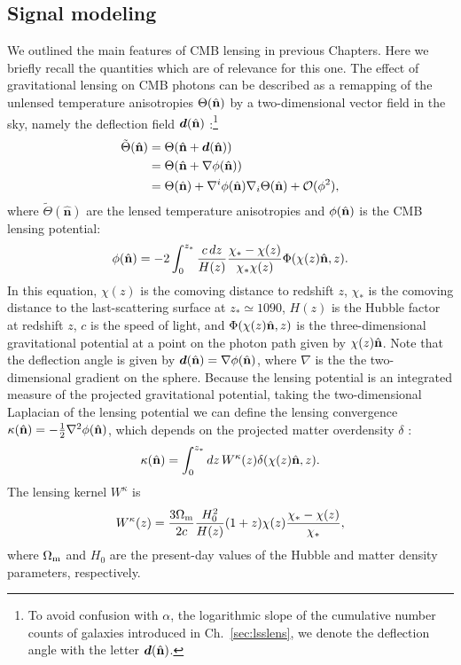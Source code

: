 \subsection{Signal modeling}
We outlined the main features of \gls{CMB} lensing in previous Chapters. Here we briefly recall the quantities which are of relevance for this one.
The effect of gravitational lensing on \gls{CMB} photons can be described as a remapping of the unlensed temperature anisotropies $\Theta(\nver)$ by a two-dimensional vector field in the sky, namely the deflection field $\bm{d}(\nver)$ \citep{Lewis2006}:\footnote{To avoid confusion with $\alpha$, the logarithmic slope of the cumulative number counts of galaxies introduced in Ch.~\eqref{sec:lsslens}, we denote the deflection angle with the letter $\bm{d}(\nver)$.}
\begin{equation}
\begin{split}
\tilde{\Theta}(\hat{\mathbf{n}}) &= \Theta(\nver + \bm{d}(\nver)) \\
&= \Theta(\nver + \nabla\phi(\nver)) \\
&= \Theta(\nver) + \nabla^i \phi(\nver) \nabla_i \Theta(\nver) + \mathcal{O}(\phi^2),
\end{split}
\end{equation}
where $\tilde{\Theta}(\hat{\mathbf{n}})$ are the lensed temperature anisotropies and $\phi(\nver)$ is the \gls{CMB} lensing potential:
\begin{equation}
\phi(\nver) = -2 \int_0^{z_*} \frac{c\,dz}{H(z)}\frac{\chi_* - \chi(z)}{\chi_*\chi(z)}\Phi(\chi(z)\nver,z).
\end{equation}
In this equation, $\chi(z)$ is the comoving distance to redshift $z$, $\chi_*$ is the comoving distance to the last-scattering surface at $z_*\simeq 1090$, $H(z)$ is the Hubble factor at redshift $z$, $c$ is the speed of light, and $\Phi(\chi(z)\nver,z)$ is the three-dimensional gravitational potential at a point on the photon path given by $\chi(z)\nver$. Note that the deflection angle is given by $\bm{d}(\nver) = \nabla\phi(\nver)$, where $\nabla$ is the the two-dimensional gradient on the sphere. Because the lensing potential is an integrated measure of the projected gravitational potential, taking the two-dimensional Laplacian of the lensing potential we can define the lensing convergence $\kappa(\nver) = -\frac{1}{2}\nabla^2\phi(\nver)$, which depends on the projected matter overdensity $\delta$ \citep{Bartelmann2001}:
\begin{equation}
\kappa(\nver) = \int_0^{z_*} dz\, W^{\kappa}(z)\delta(\chi(z)\nver,z).
\label{eqn:wkappa}
\end{equation}
The lensing kernel $W^{\kappa}$ is
%
\begin{equation}
W^{\kappa}(z) = \frac{3\Omega_{\rm m}}{2c}\frac{H_0^2}{H(z)}(1+z)\chi(z)\frac{\chi_*-\chi(z)}{\chi_*},
\end{equation}
%
where $\Omega_{\rm m}$ and $H_0$ are the present-day values of the Hubble and matter density parameters, respectively.

